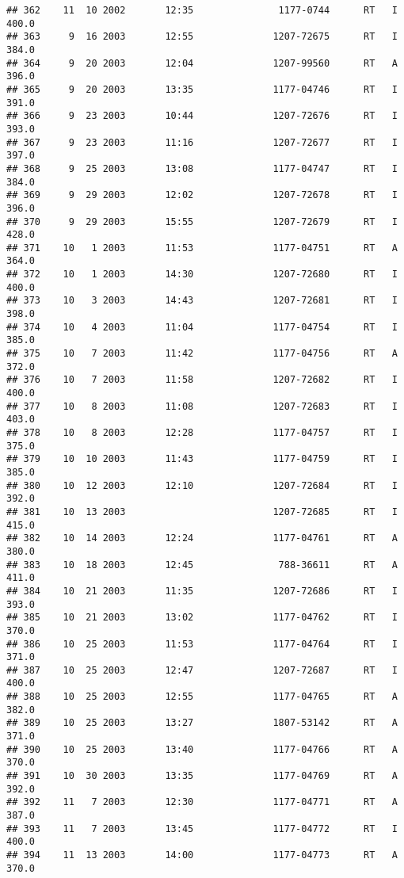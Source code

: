 \documentclass[
]{article}
\begin{document}
\begin{verbatim}
## 362    11  10 2002       12:35               1177-0744      RT   I     400.0
## 363     9  16 2003       12:55              1207-72675      RT   I     384.0
## 364     9  20 2003       12:04              1207-99560      RT   A     396.0
## 365     9  20 2003       13:35              1177-04746      RT   I     391.0
## 366     9  23 2003       10:44              1207-72676      RT   I     393.0
## 367     9  23 2003       11:16              1207-72677      RT   I     397.0
## 368     9  25 2003       13:08              1177-04747      RT   I     384.0
## 369     9  29 2003       12:02              1207-72678      RT   I     396.0
## 370     9  29 2003       15:55              1207-72679      RT   I     428.0
## 371    10   1 2003       11:53              1177-04751      RT   A     364.0
## 372    10   1 2003       14:30              1207-72680      RT   I     400.0
## 373    10   3 2003       14:43              1207-72681      RT   I     398.0
## 374    10   4 2003       11:04              1177-04754      RT   I     385.0
## 375    10   7 2003       11:42              1177-04756      RT   A     372.0
## 376    10   7 2003       11:58              1207-72682      RT   I     400.0
## 377    10   8 2003       11:08              1207-72683      RT   I     403.0
## 378    10   8 2003       12:28              1177-04757      RT   I     375.0
## 379    10  10 2003       11:43              1177-04759      RT   I     385.0
## 380    10  12 2003       12:10              1207-72684      RT   I     392.0
## 381    10  13 2003                          1207-72685      RT   I     415.0
## 382    10  14 2003       12:24              1177-04761      RT   A     380.0
## 383    10  18 2003       12:45               788-36611      RT   A     411.0
## 384    10  21 2003       11:35              1207-72686      RT   I     393.0
## 385    10  21 2003       13:02              1177-04762      RT   I     370.0
## 386    10  25 2003       11:53              1177-04764      RT   I     371.0
## 387    10  25 2003       12:47              1207-72687      RT   I     400.0
## 388    10  25 2003       12:55              1177-04765      RT   A     382.0
## 389    10  25 2003       13:27              1807-53142      RT   A     371.0
## 390    10  25 2003       13:40              1177-04766      RT   A     370.0
## 391    10  30 2003       13:35              1177-04769      RT   A     392.0
## 392    11   7 2003       12:30              1177-04771      RT   A     387.0
## 393    11   7 2003       13:45              1177-04772      RT   I     400.0
## 394    11  13 2003       14:00              1177-04773      RT   A     370.0

\end{verbatim}
\end{document}
